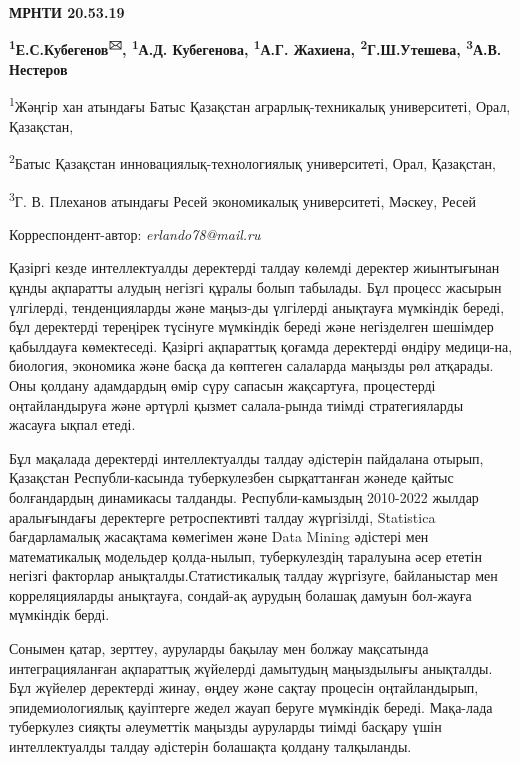 
\newpage
{\bfseries МРНТИ 20.53.19}

\begin{center}

{\bfseries \textsuperscript{1}Е.С.Кубегенов\textsuperscript{🖂},
\textsuperscript{1}А.Д. Кубегенова, \textsuperscript{1}А.Г. Жахиена,
\textsuperscript{2}Г.Ш.Утешева, \textsuperscript{3}А.В. Нестеров}

\textsuperscript{1}Жәңгір хан атындағы Батыс Қазақстан
аграрлық-техникалық университеті, Орал, Қазақстан,

\textsuperscript{2}Батыс Қазақстан инновациялық-технологиялық
университеті, Орал, Қазақстан,

\textsuperscript{3}Г. В. Плеханов атындағы Ресей экономикалық
университеті, Мәскеу, Ресей
\end{center}
Корреспондент-автор: \emph{erlando78@mail.ru}\vspace{0.5cm}

Қазіргі кезде интеллектуалды деректерді талдау көлемді деректер
жиынтығынан құнды ақпаратты алудың негізгі құралы болып табылады. Бұл
процесс жасырын үлгілерді, тенденцияларды және маңыз-ды үлгілерді
анықтауға мүмкіндік береді, бұл деректерді тереңірек түсінуге мүмкіндік
береді және негізделген шешімдер қабылдауға көмектеседі. Қазіргі
ақпараттық қоғамда деректерді өндіру медици-на, биология, экономика және
басқа да көптеген салаларда маңызды рөл атқарады. Оны қолдану адамдардың
өмір сүру сапасын жақсартуға, процестерді оңтайландыруға және әртүрлі
қызмет салала-рында тиімді стратегияларды жасауға ықпал етеді.

Бұл мақалада деректерді интеллектуалды талдау әдістерін пайдалана
отырып, Қазақстан Республи-касында туберкулезбен сырқаттанған жәнеде
қайтыс болғандардың динамикасы талданды. Республи-камыздың 2010-2022
жылдар аралығындағы деректерге ретроспективті талдау жүргізілді,
Statistica бағдарламалық жасақтама көмегімен және Data Mining әдістері
мен математикалық модельдер қолда-нылып, туберкулездің таралуына әсер
ететін негізгі факторлар анықталды.Статистикалық талдау жүргізуге,
байланыстар мен корреляцияларды анықтауға, сондай-ақ аурудың болашақ
дамуын бол-жауға мүмкіндік берді.

Сонымен қатар, зерттеу, ауруларды бақылау мен болжау мақсатында
интеграцияланған ақпараттық жүйелерді дамытудың маңыздылығы анықталды.
Бұл жүйелер деректерді жинау, өңдеу және сақтау процесін оңтайландырып,
эпидемиологиялық қауіптерге жедел жауап беруге мүмкіндік береді.
Мақа-лада туберкулез сияқты әлеуметтік маңызды ауруларды тиімді басқару
үшін интеллектуалды талдау әдістерін болашақта қолдану талқыланды.

